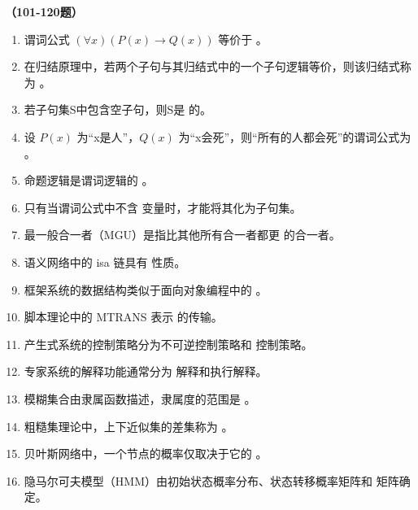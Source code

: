 \vspace{1em}
\textbf{（101-120题）}
\begin{enumerate}[resume,leftmargin=2em,itemsep=1pt]
\item 谓词公式 $(\forall x)(P(x) \to Q(x))$ 等价于 \underline{\hspace{3em}}。
\item 在归结原理中，若两个子句与其归结式中的一个子句逻辑等价，则该归结式称为 \underline{\hspace{3em}}。
\item 若子句集S中包含空子句，则S是 \underline{\hspace{3em}} 的。
\item 设 $P(x)$ 为“x是人”，$Q(x)$ 为“x会死”，则“所有的人都会死”的谓词公式为 \underline{\hspace{3em}}。
\item 命题逻辑是谓词逻辑的 \underline{\hspace{3em}}。
\item 只有当谓词公式中不含 \underline{\hspace{3em}} 变量时，才能将其化为子句集。
\item 最一般合一者（MGU）是指比其他所有合一者都更 \underline{\hspace{3em}} 的合一者。
\item 语义网络中的 isa 链具有 \underline{\hspace{3em}} 性质。
\item 框架系统的数据结构类似于面向对象编程中的 \underline{\hspace{3em}}。
\item 脚本理论中的 MTRANS 表示 \underline{\hspace{3em}} 的传输。
\item 产生式系统的控制策略分为不可逆控制策略和 \underline{\hspace{3em}} 控制策略。
\item 专家系统的解释功能通常分为 \underline{\hspace{3em}} 解释和执行解释。
\item 模糊集合由隶属函数描述，隶属度的范围是 \underline{\hspace{3em}}。
\item 粗糙集理论中，上下近似集的差集称为 \underline{\hspace{3em}}。
\item 贝叶斯网络中，一个节点的概率仅取决于它的 \underline{\hspace{3em}}。
\item 隐马尔可夫模型（HMM）由初始状态概率分布、状态转移概率矩阵和 \underline{\hspace{3em}} 矩阵确定。

\end{enumerate}

